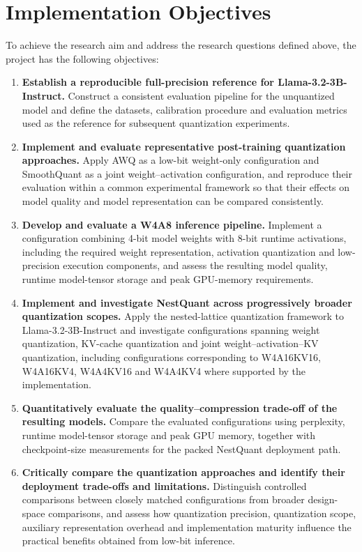 \section{Implementation Objectives}
To achieve the research aim and address the research questions defined above, the project has the following objectives:

\begin{enumerate}

    \item \textbf{Establish a reproducible full-precision reference for Llama-3.2-3B-Instruct.}  
    Construct a consistent evaluation pipeline for the unquantized model and define the datasets, calibration procedure and evaluation metrics used as the reference for subsequent quantization experiments.

    \item \textbf{Implement and evaluate representative post-training quantization approaches.}  
    Apply {AWQ} as a low-bit weight-only configuration and SmoothQuant as a joint weight--activation configuration, and reproduce their evaluation within a common experimental framework so that their effects on model quality and model representation can be compared consistently.

    \item \textbf{Develop and evaluate a {W4A8} inference pipeline.}  
    Implement a configuration combining 4-bit model weights with 8-bit runtime activations, including the required weight representation, activation quantization and low-precision execution components, and assess the resulting model quality, runtime model-tensor storage and peak GPU-memory requirements.

    \item \textbf{Implement and investigate NestQuant across progressively broader quantization scopes.}  
    Apply the nested-lattice quantization framework to Llama-3.2-3B-Instruct and investigate configurations spanning weight quantization, {KV}-cache quantization and joint weight--activation--{KV} quantization, including configurations corresponding to \ac{W4A16KV16}, \ac{W4A16KV4}, \ac{W4A4KV16} and \ac{W4A4KV4} where supported by the implementation.

    \item \textbf{Quantitatively evaluate the quality--compression trade-off of the resulting models.}  
    Compare the evaluated configurations using perplexity, runtime
model-tensor storage and peak GPU memory, together with checkpoint-size
measurements for the packed NestQuant deployment path.

    \item \textbf{Critically compare the quantization approaches and identify their deployment trade-offs and limitations.}  
    Distinguish controlled comparisons between closely matched configurations from broader design-space comparisons, and assess how quantization precision, quantization scope, auxiliary representation overhead and implementation maturity influence the practical benefits obtained from low-bit inference.

\end{enumerate}


